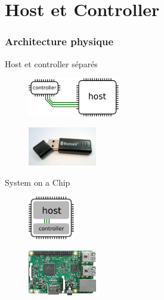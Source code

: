 \section{Host et Controller}


\begin{frame}
	\frametitle{Architecture physique}
	\begin{block}{Host et controller séparés}
		\begin{minipage}[t]{0.48\linewidth}
		\begin{figure}
			\includegraphics[width=4cm]{img/HC_sep.png}
		\end{figure}
		\end{minipage}
		\begin{minipage}[t]{0.48\linewidth}
		\begin{figure}
			\includegraphics[width=3cm]{img/dongle.jpg}
		\end{figure}
		\end{minipage}
	\end{block}
	\begin{block}{System on a Chip}
		\begin{minipage}[t]{0.48\linewidth}
		\begin{figure}
			\includegraphics[width=2cm]{img/HC_soc.png}
		\end{figure}
		\end{minipage}
		\begin{minipage}[t]{0.48\linewidth}
		\begin{figure}
			\includegraphics[width=3cm]{img/rpi3.png}
		\end{figure}
		\end{minipage}
	\end{block}
\end{frame}

